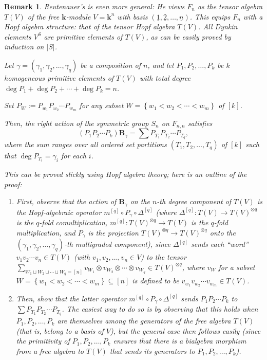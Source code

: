 \documentclass[submission]{FPSAC2026}
\newtheorem{remark}{Remark}
\newcommand{\kk}{\mathbf{k}} %
\newcommand{\abs}[1]{\left| #1 \right|}
\newcommand{\tup}[1]{\left( #1 \right)}
\begin{document}
\begin{remark}
Reutenauer's \cite[Lemma 9.33]{Reutenauer1993}
is even more general: He views $F_n$ as the tensor algebra $T\tup{V}$
of the free $\kk$-module $V = \kk^n$ with basis $\tup{\underline 1,
\underline 2,\ldots,\underline n}$.
This equips $F_n$ with a Hopf algebra structure: that of the tensor
Hopf algebra $T\tup{V}$.
All Dynkin elements $V^S$ are primitive elements of $T\tup{V}$,
as can be easily proved by induction on $\abs{S}$.

Let $\gamma = \left(
\gamma_{1},\gamma_{2},\ldots,\gamma_{q} \right) $ be a composition of $n$, and
let $P_{1}, P_{2}, \ldots, P_{k}$ be $k$ homogeneous primitive
elements of $T\tup{V}$ with total degree
$\deg P_{1} + \deg P_{2} + \cdots+ \deg P_{k} = n$.

Set $P_{W} := P_{w_{1}} P_{w_{2}} \cdots P_{w_{m}}$ for any subset $W =
\left\{  w_{1} < w_{2} < \cdots< w_{m} \right\} $ of $[k]$.

Then, the right action of the symmetric group $S_{n}$ on $F_{n,n}$
satisfies
\[
\left(  P_{1} P_{2} \cdots P_{k} \right)  \mathbf{B}_{\gamma}
= \sum P_{T_{1}} P_{T_{2}} \cdots P_{T_{q}},
\]
where the sum ranges over all ordered set partitions $\left(  T_{1}, T_{2},
\ldots, T_{q} \right) $ of $[k]$ such that $\deg P_{T_{i}} = \gamma_{i}$ for
each $i$.

This can be proved slickly using Hopf algebra theory; here is an outline
of the proof:
\begin{enumerate}
\item First, observe that the action
of $\mathbf{B}_{\gamma}$ on the $n$-th degree component of $T\left(  V\right)
$ is the Hopf-algebraic operator $m^{[q]}\circ P_{\gamma}\circ\Delta^{[q]}$
(where $\Delta^{[q]} : T\tup{V} \to T\tup{V}^{\otimes q}$
is the $q$-fold comultiplication,
$m^{[q]} : T\tup{V}^{\otimes q} \to T\tup{V}$ is the
$q$-fold multiplication, and $P_\gamma$ is the projection
$T\tup{V}^{\otimes q} \to T\tup{V}^{\otimes q}$ onto the
$\tup{ \gamma_{1},\gamma_{2},\ldots,\gamma_{q} }$-th multigraded component),
since $\Delta^{[q]}$ sends each ``word'' $v_1 v_2 \cdots v_n \in T\tup{V}$
(with $v_1, v_2, \ldots, v_n \in V$) to the tensor
$\sum_{W_1 \sqcup W_2 \sqcup \cdots \sqcup W_q = [n]}
v_{W_1} \otimes v_{W_2} \otimes \cdots \otimes v_{W_q} \in T\tup{V}^{\otimes q}$,
where $v_W$ for a subset $W =
\left\{  w_{1} < w_{2} < \cdots< w_{m} \right\} \subseteq [n]$
is defined to be $v_{w_1} v_{w_2} \cdots v_{w_m} \in T\tup{V}$.
\item Then, show that the latter
operator $m^{[q]}\circ P_{\gamma}\circ\Delta^{[q]}$
sends $P_{1}P_{2}\cdots P_{k}$ to $\sum P_{T_{1}}P_{T_{2}}\cdots
P_{T_{q}}$.
The easiest way to do so is by observing that this holds when
$P_1, P_2, \ldots, P_k$ are themselves among the generators of
the free algebra $T\tup{V}$ (that is, belong to a basis of $V$),
but the general case then follows easily
(since the primitivity of $P_1, P_2, \ldots, P_k$ ensures that
there is a bialgebra morphism from a free algebra to $T\tup{V}$
that sends its generators to $P_{1},P_{2},\ldots,P_{k}$).
\end{enumerate}
\end{remark}
\end{document}
